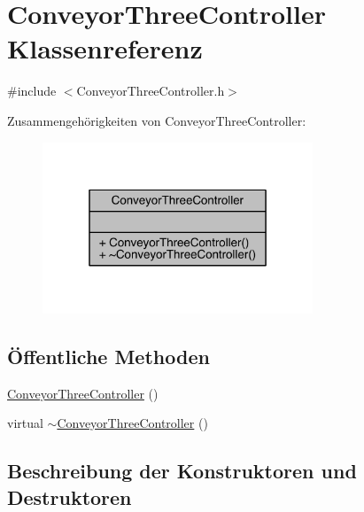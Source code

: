 \hypertarget{class_conveyor_three_controller}{}\section{Conveyor\+Three\+Controller Klassenreferenz}
\label{class_conveyor_three_controller}


{\ttfamily \#include $<$Conveyor\+Three\+Controller.\+h$>$}



Zusammengehörigkeiten von Conveyor\+Three\+Controller\+:\nopagebreak
\begin{figure}[H]
\begin{center}
\leavevmode
\includegraphics[width=229pt]{class_conveyor_three_controller__coll__graph}
\end{center}
\end{figure}
\subsection*{Öffentliche Methoden}
\begin{DoxyCompactItemize}
\item 
\hyperlink{class_conveyor_three_controller_ad35c62e9764dc39314521c3b7e451eb4}{Conveyor\+Three\+Controller} ()
\item 
virtual \hyperlink{class_conveyor_three_controller_a3ea9a30cb49da76384b3633d11240c92}{$\sim$\+Conveyor\+Three\+Controller} ()
\end{DoxyCompactItemize}


\subsection{Beschreibung der Konstruktoren und Destruktoren}
\hypertarget{class_conveyor_three_controller_ad35c62e9764dc39314521c3b7e451eb4}{}\label{class_conveyor_three_controller_ad35c62e9764dc39314521c3b7e451eb4} 
